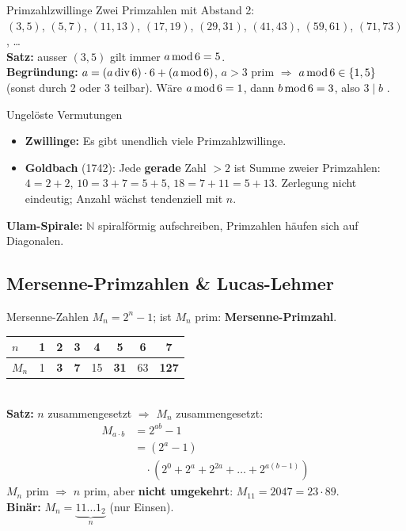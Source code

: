 \documentclass[a4paper, fontsize=7pt]{scrartcl}
\newcommand{\Div}{\mskip3mu\mathrm{div}\mskip3mu}
\newcommand{\Mod}{\mskip3mu\mathrm{mod}\mskip3mu}
\begin{document}
\begin{mainbox}{Primzahlzwillinge}
Zwei Primzahlen mit Abstand 2:\\
$(3,5)$, $(5,7)$, $(11,13)$, $(17,19)$, $(29,31)$, $(41,43)$, $(59,61)$,
$(71,73)$, \ldots\\
\textbf{Satz:} ausser $(3, 5)$ gilt immer $a \Mod 6 = 5$.\\
\textbf{Begründung:} $a = (a \Div 6) \cdot 6 + (a \Mod 6)$, $a > 3$ prim
$\Rightarrow$ $a \Mod 6 \in \{1, 5\}$ (sonst durch 2 oder 3 teilbar).
Wäre $a \Mod 6 = 1$, dann $b \Mod 6 = 3$, also $3 \mid b$ \lightning.
\end{mainbox}

\begin{subbox}{Ungelöste Vermutungen}
\begin{itemize}
    \item \textbf{Zwillinge:} Es gibt unendlich viele Primzahlzwillinge.
    \item \textbf{Goldbach} (1742): Jede \textbf{gerade} Zahl $> 2$ ist
          Summe zweier Primzahlen: $4 = 2+2$, $10 = 3+7 = 5+5$,
          $18 = 7+11 = 5+13$. Zerlegung nicht eindeutig; Anzahl wächst
          tendenziell mit $n$.
\end{itemize}
\textbf{Ulam-Spirale:} $\mathbb{N}$ spiralförmig aufschreiben, Primzahlen
häufen sich auf Diagonalen.
\end{subbox}

\subsection{Mersenne-Primzahlen \& Lucas-Lehmer}

\begin{mainbox}{Mersenne-Zahlen}
$\boxed{M_n = 2^n - 1}$; ist $M_n$ prim: \textbf{Mersenne-Primzahl}.\\
\setlength{\tabcolsep}{2.5pt}
\begin{tabular}{@{}l|ccccccc@{}}
$n$ & 1 & 2 & 3 & 4 & 5 & 6 & 7 \\ \hline
$M_n$ & 1 & \textbf{3} & \textbf{7} & 15 & \textbf{31} & 63 & \textbf{127}
\end{tabular}\\[2pt]
\textbf{Satz:} $n$ zusammengesetzt $\Rightarrow$ $M_n$ zusammengesetzt:
\begin{align*}
M_{a \cdot b} &= 2^{ab} - 1\\
&= (2^a - 1)\\
&\quad \cdot \left(2^{0} + 2^{a} + 2^{2a} + \ldots + 2^{a(b-1)}\right)
\end{align*}
$M_n$ prim $\Rightarrow$ $n$ prim, aber \textbf{nicht umgekehrt}:
$M_{11} = 2047 = 23 \cdot 89$.\\
\textbf{Binär:} $M_n = \underbrace{11\ldots1_2}_{n}$ (nur Einsen).
\end{mainbox}
\end{document}
